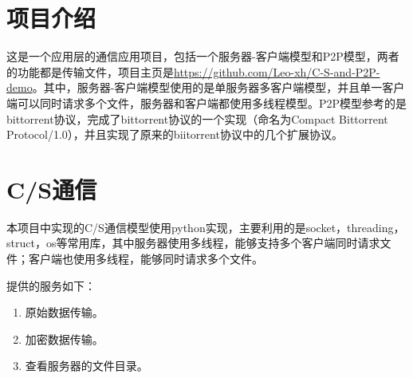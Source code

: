 \documentclass[15pt]{ctexart}
\begin{document}
    
    \tableofcontents
    \newpage
    \section{项目介绍} %
    \label{sec:项目介绍}
    \par 这是一个应用层的通信应用项目，包括一个服务器-客户端模型和P2P模型，两者的功能都是传输文件，项目主页是\url{https://github.com/Leo-xh/C-S-and-P2P-demo}。其中，服务器-客户端模型使用的是单服务器多客户端模型，并且单一客户端可以同时请求多个文件，服务器和客户端都使用多线程模型。P2P模型参考的是bittorrent协议，完成了bittorrent协议的一个实现（命名为Compact Bittorrent Protocol/1.0），并且实现了原来的biitorrent协议中的几个扩展协议。
    \section{C/S通信} %
    \label{sec:c_s通信}
    	\par 本项目中实现的C/S通信模型使用python实现，主要利用的是socket，threading，struct，os等常用库，其中服务器使用多线程，能够支持多个客户端同时请求文件；客户端也使用多线程，能够同时请求多个文件。
    	\par 提供的服务如下：
    	\begin{enumerate}[1.]
    		\item 原始数据传输。
    		\item 加密数据传输。
    		\item 查看服务器的文件目录。
    	\end{enumerate}
\end{document}
